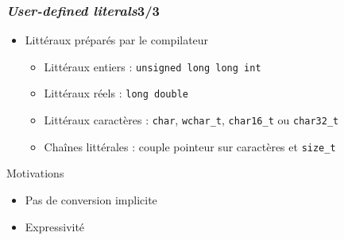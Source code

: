 \documentclass[C++.tex]{subfiles}
\begin{document}
\begin{frame}[fragile]
	\frametitle{\textit{User-defined literals}\titlehfill{}3/3}
	\begin{itemize}
		\item Littéraux \og préparés\fg{} par le compilateur
		\begin{itemize}
			\item Littéraux entiers : \lstinline|unsigned long long int|
			\item Littéraux réels : \lstinline|long double|
			\item Littéraux caractères : \lstinline|char|, \lstinline|wchar_t|, \lstinline|char16_t| ou \lstinline|char32_t|
			\item Chaînes littérales : couple pointeur sur caractères et \lstinline|size_t|
		\end{itemize}
	\end{itemize}

	\begin{block}{Motivations}
		\begin{itemize}
			\item Pas de conversion implicite
			\item Expressivité

		\end{itemize}
	\end{block}
\end{frame}
\end{document}
